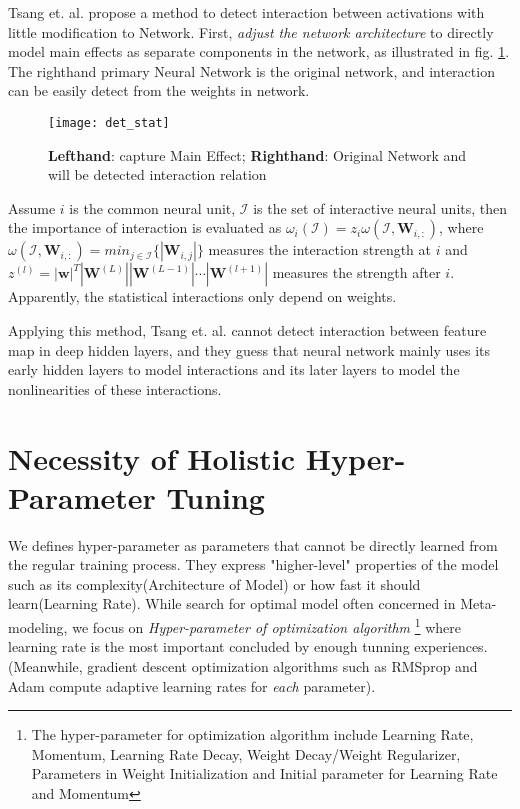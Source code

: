 \documentclass{mcmthesis}
\begin{document}
Tsang et. al. \cite{tsang2017detecting} propose a method to detect interaction between activations with little modification to Network. 
First, \textit{adjust the network architecture} to directly model main effects as separate
components in the network, as illustrated in fig. \ref{fig:det_stat}. The righthand primary Neural Network is the original network, and interaction can be easily detect from the weights in network.

\begin{figure}[h]
	\centering
	\texttt{[image: det\_stat]} 
	\caption{\textbf{Lefthand}: capture Main Effect; \textbf{Righthand}: Original Network and will be detected interaction relation}
	\label{fig:det_stat}
\end{figure}

Assume $i$ is the common neural unit, $\mathcal{I}$ is the set of interactive neural units, then the importance of interaction is evaluated as   $\omega_i(\mathcal{I})=z_i \omega (\mathcal{I}, \mathbf{W}_{i,:} ) $, 
where $\omega(\mathcal{I} ,\mathbf{W}_{i,:})  =  min_{j \in \mathcal{I}} \{ |\mathbf{W}_{i,j}| \} $ measures the interaction strength at $i$ and
$z^{(l)} = |\mathbf{w}|^T  \left| \mathbf{W}^{(L)} \right|   \left| \mathbf{W}^{(L-1)} \right|  \cdots  \left| \mathbf{W}^{(l+1)} \right|   $ measures the strength after $i$. Apparently, the statistical interactions only depend on weights. 

Applying this method, Tsang et. al. cannot detect interaction between feature map in deep hidden layers, and they guess that neural network mainly uses its early hidden layers to model interactions
and its later layers to model the nonlinearities of these interactions. 

 
\section{Necessity of Holistic Hyper-Parameter Tuning}
We defines hyper-parameter as parameters that  cannot be directly learned from the regular training process. They express "higher-level" properties of the model such as its complexity(Architecture of Model) or how fast it should learn(Learning Rate). While search for optimal model often concerned in Meta-modeling, we  focus on \textit{Hyper-parameter of optimization algorithm} \footnote{The hyper-parameter for  optimization algorithm include Learning Rate, Momentum, Learning Rate Decay, Weight Decay/Weight Regularizer, Parameters in Weight Initialization and Initial parameter for Learning Rate and Momentum} where learning rate is the most important concluded by enough tunning experiences.  (Meanwhile, gradient descent optimization algorithms such as RMSprop and Adam compute adaptive learning rates for \textit{each} parameter). 
\end{document}
